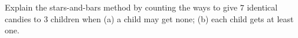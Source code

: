 Explain the stars-and-bars method by counting the ways to give $7$ identical candies to $3$ children when (a) a child may get none; (b) each child gets at least one.
